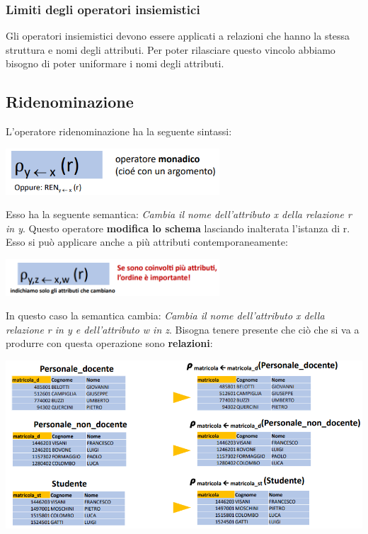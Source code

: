 \documentclass[12pt]{article}
\begin{document}
\subsubsection{Limiti degli operatori insiemistici}
Gli operatori insiemistici devono essere applicati a relazioni che hanno la stessa struttura e nomi degli attributi.
Per poter rilasciare questo vincolo abbiamo bisogno di poter uniformare i nomi degli attributi.
\subsection{Ridenominazione}
L'operatore ridenominazione ha la seguente sintassi:
\begin{center}
    \includegraphics[width = 0.60\textwidth]{Images/128.PNG}
\end{center}
Esso ha la seguente semantica: \textit{Cambia il nome dell'attributo x della relazione r in y}.
Questo operatore \textbf{modifica lo schema} lasciando inalterata l'istanza di r.
Esso si può applicare anche a più attributi contemporaneamente:
\begin{center}
    \includegraphics[width = 0.60\textwidth]{Images/129.PNG}
\end{center}
In questo caso la semantica cambia: \textit{Cambia il nome dell'attributo x della relazione r in y e dell'attributo w in z}.
Bisogna tenere presente che ciò che si va a produrre con questa operazione sono \textbf{relazioni}:
\begin{center}
    \includegraphics[width =1\textwidth]{Images/130.PNG}
\end{center}
\end{document}
